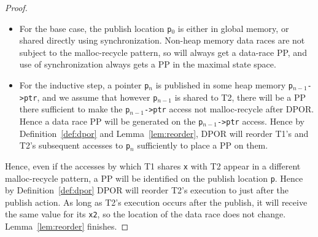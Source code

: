 \documentclass[pldi]{sigplanconf-pldi15}
\begin{document}
\begin{proof}
\newcommand\publish[1]{{\tt p}$_{#1}$}
\begin{itemize}
	\item For the base case, the publish location \publish{0} is either in global memory, or shared directly using synchronization.
		Non-heap memory data races are not subject to the malloc-recycle pattern, so will always get a data-race PP,
		and use of synchronization always gets a PP in the maximal state space.
	\item For the inductive step, a pointer \publish{n} is published in some heap memory \publish{n-1}\texttt{->ptr},
		and we assume that however \publish{n-1} is shared to T2,
		there will be a PP there
		sufficient to make the \publish{n-1}\texttt{->ptr} access not malloc-recycle after DPOR.
		Hence a data race PP will be generated on the \publish{n-1}\texttt{->ptr} access.
		Hence by Definition~\ref{def:dpor} and Lemma~\ref{lem:reorder},
		DPOR will reorder T1's and T2's subsequent accesses to \publish{n} sufficiently to place a PP on them.
\end{itemize}

Hence, even if the accesses by which T1 shares {\tt x} with T2 appear in a different malloc-recycle pattern,
a PP will be identified on the publish location {\tt p}.
Hence by Definition~\ref{def:dpor} DPOR will reorder T2's execution to just after the publish action.
As long as T2's execution occurs after the publish, it will receive the same value for its {\tt x2}, so the location of the data race does not change.
Lemma~\ref{lem:reorder} finishes.


\end{proof}


\end{document}
